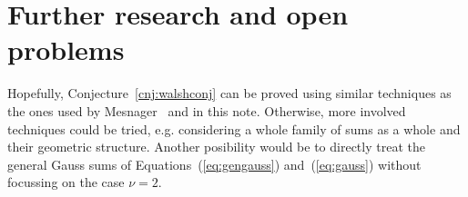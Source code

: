 \documentclass{llncs}
\makeatletter
\newcommand{\eg}{e.g.\@\xspace}
\makeatother
\begin{document}
\section{Further research and open problems}

Hopefully, Conjecture~\ref{cnj:walshconj} can be proved using
similar techniques
as the ones used by Mesnager~\cite{DBLP:journals/dcc/Mesnager11,DBLP:journals/tit/Mesnager11}
and in this note.
Otherwise, more involved techniques could be tried, \eg considering a whole
family of sums as a whole and their geometric structure.
Another posibility would be to directly treat the general Gauss sums of
Equations~(\ref{eq:gengauss}) and~(\ref{eq:gauss}) without focussing
on the case $\nu = 2$.



\end{document}
